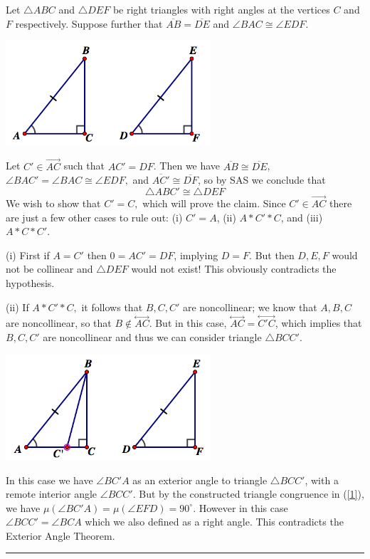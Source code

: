 \documentclass[12pt]{article}
\newcommand{\ray}[1]{\overrightarrow{#1}}
\renewcommand{\line}[1]{\stackrel{\longleftrightarrow}{#1}}
\renewcommand{\deg}{^{\circ}}
\newcommand{\seg}[1]{\overline{#1}}
\newenvironment{proof}{\noindent {\bf Proof:}}{\hfill
\rule{1mm}{3mm} \bigskip}
\begin{document}
\begin{enumerate}
	\begin{proof} Let $\triangle ABC$ and $\triangle DEF$ be right triangles with right angles at the vertices $C$ and $F$ respectively. Suppose further that $\seg{AB}=\seg{DE}$ and $\angle BAC \cong \angle EDF$.
	\begin{center}\includegraphics[width=3in]{5_1.png}\end{center}
Let $C'\in \ray{AC}$ such that $AC'=DF$. Then we have $\seg{AB}\cong\seg{DE}$, $\angle BAC'=\angle BAC\cong\angle EDF,$ and $\seg{AC'}\cong\seg{DF}$, so by SAS we conclude that \begin{equation}\label{1} \triangle ABC' \cong \triangle DEF \end{equation}
We wish to show that $C'=C,$ which will prove the claim. Since $C'\in\ray{AC}$ there are just a few other cases to rule out: (i) $C'=A$, (ii) $A*C'*C$, and (iii) $A*C*C'$.

\noindent(i) First if $A=C'$ then $0=AC'=DF$, implying $D=F$. But then $D,E,F$ would not be collinear and $\triangle DEF$ would not exist! This obviously contradicts the hypothesis.

\noindent(ii) If $A*C'*C,$ it follows that $B,C,C'$ are noncollinear; we know that $A,B,C$ are noncollinear, so that $B \notin \line{AC}$. But in this case, $\line{AC}=\line{C'C}$, which implies that $B,C,C'$ are noncollinear and thus we can consider triangle $\triangle BCC'$.
\begin{center}\includegraphics[width=3in]{5_2.png}\end{center}
In this case we have $\angle BC'\!A$ as an exterior angle to triangle $\triangle BCC'$, with a remote interior angle $\angle BCC'$. But by the constructed triangle congruence in (\ref{1}), we have $\mu(\angle BC'\!A) = \mu(\angle EFD)=90\deg$. However in this case $\angle BCC'= \angle BCA$ which we also defined as a right angle. This contradicts the Exterior Angle Theorem.


\end{proof}
\end{enumerate}
\end{document}
